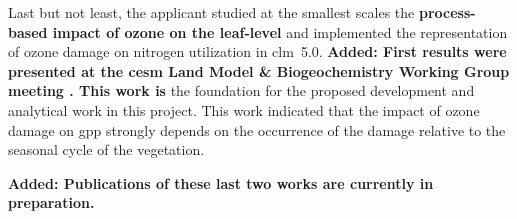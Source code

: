 Last but not least, the applicant studied at the smallest scales the \textbf{process-based impact of ozone on the leaf-level} and implemented the representation of ozone damage on nitrogen utilization in \gls{clm}~5.0. \textbf{\color{blue}Added: First results were presented at the \gls{cesm} Land Model \& Biogeochemistry Working Group meeting \parencite{CESMWP:Falk2021}. This work is }the foundation for the proposed development and analytical work in this project. This work indicated that the impact of ozone damage on \gls{gpp} strongly depends on the occurrence of the damage relative to the seasonal cycle of the vegetation.

\textbf{\color{blue}Added: Publications of these last two works are currently in preparation.}
